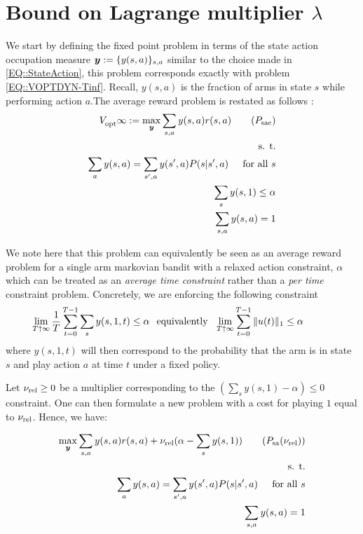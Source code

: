 \section{Bound on Lagrange multiplier $\lambda$} \label{APX:LAGBOUND}

We start by defining the fixed point problem in terms of the state action occupation measure ${\bm{y}} := \{y(s, a)\}_{s, a}$  similar to the choice made in \eqref{EQ::StateAction}, this problem corresponds exactly with problem \eqref{EQ::VOPTDYN-Tinf}. Recall, $y(s, a)$ is the fraction of arms in state $s$ while performing action $a$.The average reward problem is restated as follows :
\begin{align}\label{EQ:PSAC}
    \Vopt{}{\infty} := \max_{\by} \sum_{s, a} y(s, a) r(s, a) \tag{$P_{\text{sac}}$}\\
    \text{s. t.} \nonumber \\
    \sum_{a} y(s, a) = \sum_{s', a} y(s', a) P(s|s', a) \hspace{0.2 in} \text{for all $s$} \nonumber\\
    \sum_{s} y(s, 1) \leq \alpha \nonumber \\
    \sum_{s, a} y(s, a) = 1 \nonumber
\end{align}

We note here that this problem can equivalently be seen as an average reward problem for a single arm markovian bandit with a relaxed action constraint, $\alpha$ which can be treated as an \emph{average time constraint} rather than a \emph{per time} constraint problem. Concretely, we are enforcing the following constraint
\[
\lim_{T \uparrow \infty}\frac{1}{T} \sum_{t = 0}^{T- 1}\sum_{s} y(s, 1, t) \leq \alpha \hspace{0.1 in} \text{equivalently} \hspace{0.1 in} 
\lim_{T \uparrow \infty}\sum_{t = 0}^{T - 1} \|u(t)\|_1 \leq \alpha \hspace{0.2 in}  \hspace{0.2 in} 
\]
where $y(s,1,t)$ will then correspond to the probability that the arm is in state $s$ and play action $a$ at time $t$ under a fixed policy.

Let $\mathbf{\nu_{\text{rel}}} \geq 0$ be a multiplier corresponding to the  $(\sum_{s} y(s, 1) -\alpha ) \leq 0$ constraint. One can then formulate a new problem with a cost for playing $1$ equal to $\mathbf{\nu_{\text{rel}}}$. Hence, we have:

\begin{align}\label{EQ:RELPROB}
    \max_{\by} \sum_{s, a} y(s, a) r(s, a) + \laghomosub(\alpha - \sum_{s} y(s, 1))\tag{$P_{\text{sa}}(\laghomosub)$}\\
    \text{s. t.} \nonumber \\
    \sum_{a} y(s, a) = \sum_{s', a} y(s', a) P(s|s', a) \hspace{0.2 in} \text{for all $s$} \nonumber\\
    \sum_{s, a} y(s, a) = 1 \nonumber
\end{align}

